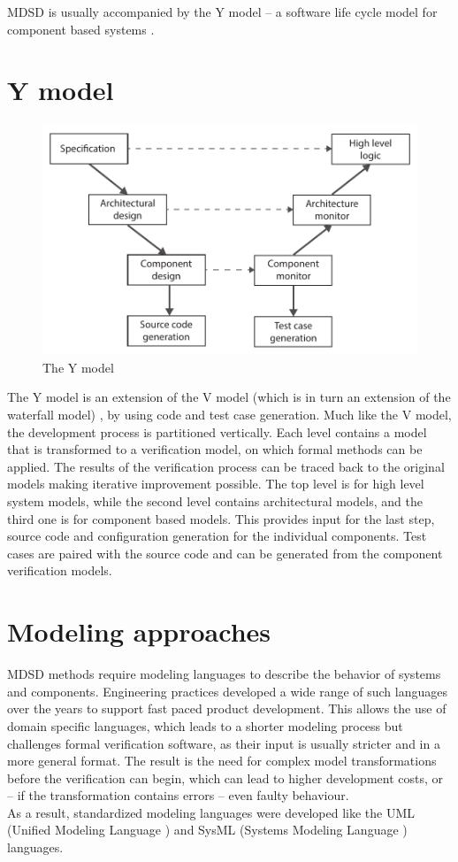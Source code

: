 MDSD is usually accompanied by the Y model -- a software life cycle model for component based systems \citep{ymodel}.

\section*{Y model} %

\begin{figure}[h]
	\centering
	\includegraphics[width=0.8\linewidth]{include/figures/chapter_1/YModel}
	\caption{The Y model}
	\label{fig:intro:vmodel}
\end{figure}

The Y model \citep{ymodel} is an extension of the V model (which is in turn an extension of the waterfall model) \citep{randomwikipedialink3}, by using code and test case generation. Much like the V model, the development process is partitioned vertically. Each level contains a model that is transformed to a verification model, on which formal methods can be applied. The results of the verification process can be traced back to the original models making iterative improvement possible. The top level is for high level system models, while the second level contains architectural models, and the third one is for component based models. This provides input for the last step, source code and configuration generation for the individual components. Test cases are paired with the source code and can be generated from the component verification models.

\section*{Modeling approaches}

MDSD methods require modeling languages to describe the behavior of systems and components. Engineering practices developed a wide range of such languages over the years to support fast paced product development. This allows the use of domain specific languages, which leads to a shorter modeling process but challenges formal verification software, as their input is usually stricter and in a more general format. The result is the need for complex model transformations before the verification can begin, which can lead to higher development costs, or -- if the transformation contains errors -- even faulty behaviour.\\
As a result, standardized modeling languages were developed like the UML (Unified Modeling Language \citep{uml}) and SysML (Systems Modeling Language \citep{sysml}) languages.

